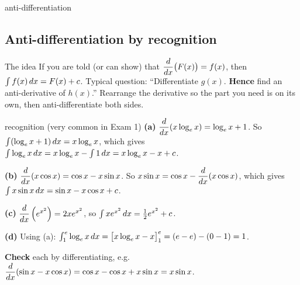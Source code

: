\begin{example}{anti-differentiation \byhand}
\renewcommand{\arraystretch}{1.6}
\end{example}

\subsection{Anti-differentiation by recognition}
\label{sec:recog}

\begin{keyres}{The idea}
If you are told (or can show) that $\dfrac{d}{dx}\big(F(x)\big)=f(x)$, then $\int f(x)\,dx=F(x)+c$. Typical question: ``Differentiate $g(x)$. \textbf{Hence} find an anti-derivative of $h(x)$.'' Rearrange the derivative so the part you need is on its own, then anti-differentiate both sides.
\end{keyres}

\begin{example}{recognition (very common in Exam 1) \byhand}
\textbf{(a)} $\dfrac{d}{dx}(x\log_e x)=\log_e x+1$. So $\int(\log_e x+1)\,dx=x\log_e x$, which gives $\int\log_e x\,dx=x\log_e x-\int1\,dx=x\log_e x-x+c$.\par
\textbf{(b)} $\dfrac{d}{dx}(x\cos x)=\cos x-x\sin x$. So $x\sin x=\cos x-\dfrac{d}{dx}(x\cos x)$, which gives $\int x\sin x\,dx=\sin x-x\cos x+c$.\par
\textbf{(c)} $\dfrac{d}{dx}\left(e^{x^2}\right)=2xe^{x^2}$, so $\int xe^{x^2}\,dx=\frac12e^{x^2}+c$.\par
\textbf{(d)} Using (a): $\int_1^e\log_e x\,dx=\big[x\log_e x-x\big]_1^e=(e-e)-(0-1)=1$.\par
\textbf{Check} each by differentiating, e.g.\ $\dfrac{d}{dx}(\sin x-x\cos x)=\cos x-\cos x+x\sin x=x\sin x$. \tick
\end{example}

